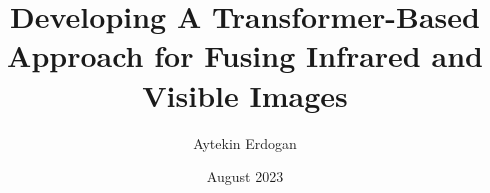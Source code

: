 \documentclass[chaparabic,is,ms,10pt,single]{metu}
\author{Aytekin Erdogan} %
\title{Developing A Transformer-Based Approach for Fusing Infrared and Visible Images} %
\date{August 2023} %
\begin{document}
\begin{preliminaries}


\end{preliminaries}
%   
% 
%

\setlength{\parindent}{0em}
\setlength{\parskip}{10pt}












%
%

%

% 

\appendix



%
\end{document}
